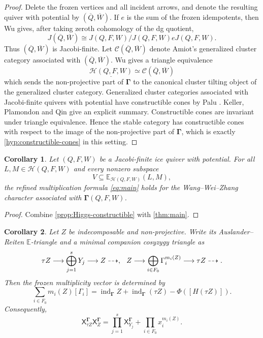 \documentclass[11pt,reqno]{article}
\numberwithin{equation}{section}
\newtheorem{corollary}[corollary]{Corollary}
\theoremstyle{definition}
\DeclareMathOperator{\ind}{ind}
\newcommand{\E}{\mathbb E}
\newcommand{\X}{\mathsf X}
\begin{document}
\begin{proof}
Delete the frozen vertices and all incident arrows, and denote the resulting
quiver with potential by $(\overline Q,\overline W)$.  If $e$ is the sum of the
frozen idempotents, then Wu \cite[Definition~7.6 and Proposition~7.8]{WuRelative} gives,
after taking zeroth cohomology of the dg quotient,
\[
 J(\overline Q,\overline W)
 \cong J(Q,F,W)/J(Q,F,W)eJ(Q,F,W).
\]
Thus $(\overline Q,\overline W)$ is Jacobi-finite.  Let
$\mathcal C(\overline Q,\overline W)$ denote Amiot's generalized cluster category associated with $(\overline Q,\overline W)$.  Wu \cite[Theorem~7.10]{WuRelative} gives a triangle equivalence
\[
 \underline{\mathcal H(Q,F,W)}
 \simeq
 \mathcal C(\overline Q,\overline W)
\]
which sends the non-projective part of $\boldsymbol\Gamma$ to the canonical cluster tilting object of the generalized cluster category.  Generalized cluster categories associated with Jacobi-finite quivers with potential have constructible cones by Palu \cite[Sections~2.4 and~2.5]{Palu2012}.  Keller, Plamondon and Qin \cite[Example~2.9]{KellerPlamondonQin} give an explicit summary.  Constructible cones are invariant under triangle equivalence.  Hence the stable category has constructible cones with respect to the image of the non-projective part of $\boldsymbol\Gamma$, which is exactly \cref{hyp:constructible-cones} in this setting.
\end{proof}

\begin{corollary}\label{cor:Higgs-main}
Let $(Q,F,W)$ be a Jacobi-finite ice quiver with potential.  For all $L,M\in\mathcal H(Q,F,W)$ and every nonzero subspace
\[
 V\subseteq\E_{\mathcal H(Q,F,W)}(L,M),
\]
the refined multiplication formula \eqref{eq:main} holds for the Wang--Wei--Zhang character associated with $\boldsymbol\Gamma(Q,F,W)$.
\end{corollary}

\begin{proof}
Combine \cref{prop:Higgs-constructible} with \cref{thm:main}.
\end{proof}

\begin{corollary}\label{cor:frozen-mesh}
Let $Z$ be indecomposable and non-projective.  Write its Auslander--Reiten
$\E$-triangle and a minimal companion cosyzygy triangle as
\[
 \tau Z\longrightarrow\bigoplus_{j=1}^{s}Y_j\longrightarrow Z
   \dashrightarrow,
 \hspace{2.5mm}
 Z\longrightarrow\bigoplus_{i\in F_0}\Gamma_i^{m_i(Z)}
   \longrightarrow\tau Z\dashrightarrow.
\]
Then the frozen multiplicity vector is determined by
\begin{equation}\label{eq:Higgs-frozen-class}
 \sum_{i\in F_0}m_i(Z)[\Gamma_i]
 =\ind_{\boldsymbol\Gamma} Z
  +\ind_{\boldsymbol\Gamma}(\tau Z)
  -\Phi([H(\tau Z)]).
\end{equation}
Consequently,
\begin{equation}\label{eq:frozen-mesh}
 \X^{\boldsymbol\Gamma}_{\tau Z}\X^{\boldsymbol\Gamma}_{Z}
 =\prod_{j=1}^{s}\X^{\boldsymbol\Gamma}_{Y_j}
  +\prod_{i\in F_0}x_i^{m_i(Z)}.
\end{equation}
\end{corollary}
\end{document}
